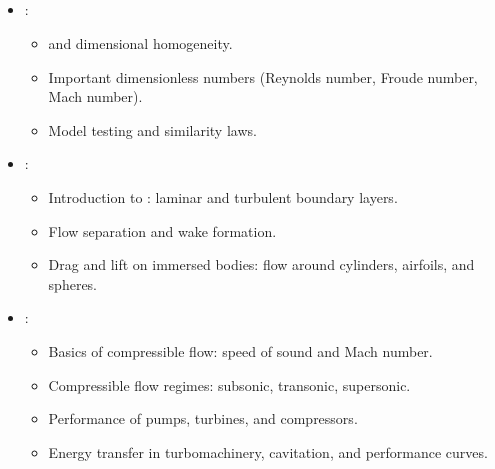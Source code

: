 \documentclass[letterpaper,10pt,english]{jupyterBook}
\begin{document}
\subsection{}
\label{\detokenize{syllabus:weeks-15-16-dimensional-analysis-external-flow-and-turbomachinery}}\begin{itemize}
\item {} 
\sphinxAtStartPar
{}:
\begin{itemize}
\item {} 
\sphinxAtStartPar
{} and dimensional homogeneity.

\item {} 
\sphinxAtStartPar
Important dimensionless numbers (Reynolds number, Froude number, Mach number).

\item {} 
\sphinxAtStartPar
Model testing and similarity laws.

\end{itemize}

\item {} 
\sphinxAtStartPar
{}:
\begin{itemize}
\item {} 
\sphinxAtStartPar
Introduction to : laminar and turbulent boundary layers.

\item {} 
\sphinxAtStartPar
Flow separation and wake formation.

\item {} 
\sphinxAtStartPar
Drag and lift on immersed bodies: flow around cylinders, airfoils, and spheres.

\end{itemize}

\item {} 
\sphinxAtStartPar
{}:
\begin{itemize}
\item {} 
\sphinxAtStartPar
Basics of compressible flow: speed of sound and Mach number.

\item {} 
\sphinxAtStartPar
Compressible flow regimes: subsonic, transonic, supersonic.

\item {} 
\sphinxAtStartPar
Performance of pumps, turbines, and compressors.

\item {} 
\sphinxAtStartPar
Energy transfer in turbomachinery, cavitation, and performance curves.

\end{itemize}

\end{itemize}
\end{document}

